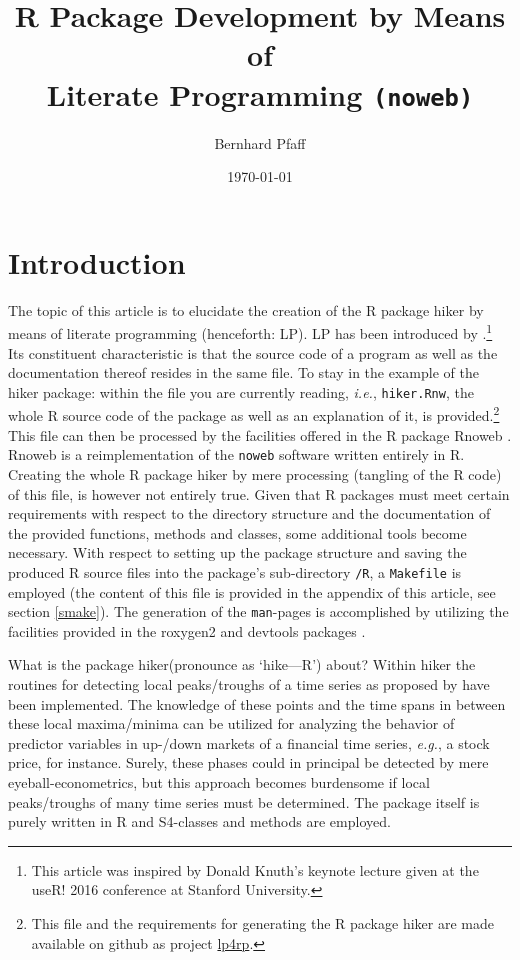 \documentclass[a4paper]{article}
\newcommand{\pkg}[1]{{\fontseries{b}\selectfont #1}}
\begin{document}
\title{R Package Development by Means of \\
  Literate Programming \texttt{(noweb)}}
\author{Bernhard Pfaff}
\date{\today}

\maketitle

\section{Introduction}
\label{S1}

The topic of this article is to elucidate the creation of the R
package \pkg{hiker} by means of literate programming (henceforth:
LP). LP has been introduced by \citet{KNU1984}.\footnote{This article
  was inspired by Donald Knuth's keynote lecture given at the useR!
  2016 conference at Stanford University.} Its constituent
characteristic is that the source code of a program as well as the
documentation thereof resides in the same file. To stay in the example
of the \pkg{hiker} package: within the file you are currently reading,
\emph{i.e.}, \texttt{hiker.Rnw}, the whole R source code of the
package as well as an explanation of it, is provided.\footnote{This
  file and the requirements for generating the R package \pkg{hiker}
  are made available on github as
  project \href{https://github.com/bpfaff/lp4rp}{lp4rp}.}
This file can then be processed by the facilities offered in the R package
\pkg{Rnoweb} \citep[see][]{IHA2013}. \pkg{Rnoweb} is a
reimplementation of the \texttt{noweb} software \citep[see][]{RAM1994}
written entirely in R. Creating the whole R package \pkg{hiker} by
mere processing (tangling of the R code) of this file, is however not
entirely true. Given that R packages must meet certain requirements
with respect to the directory structure and the documentation of the
provided functions, methods and classes, some additional tools become
necessary. With respect to setting up the package structure and
saving the produced R source files into the package's sub-directory
\texttt{/R}, a \texttt{Makefile} is employed (the content of this file
is provided in the appendix of this article, see section
\ref{smake}). The generation of the \texttt{man}-pages is accomplished
by utilizing the facilities provided in the \pkg{roxygen2} and
\pkg{devtools} packages \citep[see][respectively]{WIC2015,WIC2016}.\par

What is the package \pkg{hiker}(pronounce as `hike---R') about? Within
\pkg{hiker} the routines for detecting local peaks/troughs of a time
series as proposed by \citet{PAL2009} have been implemented. The
knowledge of these points and the time spans in between these local
maxima/minima can be utilized for analyzing the behavior of predictor
variables in up-/down markets of a financial time series, \emph{e.g.},
a stock price, for instance. Surely, these phases could in principal
be detected by mere eyeball-econometrics, but this approach becomes
burdensome if local peaks/troughs of many time series must be
determined. The package itself is purely written in R and S4-classes
and methods are employed.\par
\end{document}
